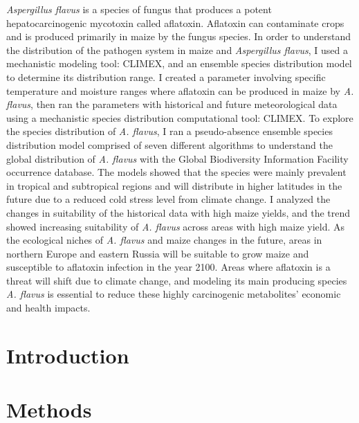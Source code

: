 \documentclass[a4paper,11]{article}
\begin{document}
\textit{Aspergillus flavus} is a species of fungus that produces a potent hepatocarcinogenic mycotoxin called aflatoxin. Aflatoxin can contaminate crops and is produced primarily in maize by the fungus species. In order to understand the distribution of the pathogen system in maize and \textit{Aspergillus flavus}, I used a mechanistic modeling tool: CLIMEX, and an ensemble species distribution model to determine its distribution range. I created a parameter involving specific temperature and moisture ranges where aflatoxin can be produced in maize by \textit{A. flavus}, then ran the parameters with historical and future meteorological data using a mechanistic species distribution computational tool: CLIMEX. To explore the species distribution of \textit{A. flavus}, I ran a pseudo-absence ensemble species distribution model comprised of seven different algorithms to understand the global distribution of \textit{A. flavus} with the Global Biodiversity Information Facility occurrence database. The models showed that the species were mainly prevalent in tropical and subtropical regions and will distribute in higher latitudes in the future due to a reduced cold stress level from climate change. I analyzed the changes in suitability of the historical data with high maize yields, and the trend showed increasing suitability of \textit{A. flavus} across areas with high maize yield. As the ecological niches of \textit{A. flavus} and maize changes in the future, areas in northern Europe and eastern Russia will be suitable to grow maize and susceptible to aflatoxin infection in the year 2100. Areas where aflatoxin is a threat will shift due to climate change, and modeling its main producing species \textit{A. flavus} is essential to reduce these highly carcinogenic metabolites' economic and health impacts.


\pagebreak
\tableofcontents
\pagebreak
\listoffigures
\listoftables
\pagebreak
\newpage

\cleardoublepage{}

\section{Introduction}


\newpage
\section{Methods}

\end{document}
